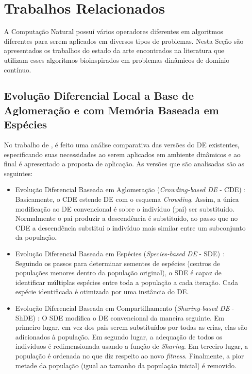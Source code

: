 \chapter{Trabalhos Relacionados}
\label{ch:relacionados}
A Computação Natural possuí vários operadores diferentes em algoritmos diferentes para serem aplicados em diversos tipos de problemas. Nesta Seção são apresentados os trabalhos do estado da arte encontrados na literatura que utilizam esses algoritmos bioinspirados em problemas dinâmicos de domínio contínuo.

\section{Evolução Diferencial Local a Base de Aglomeração e com Memória Baseada em Espécies}
\label{sec:crowding_base_de}

No trabalho de \cite{kundu2013crowding}, é feito uma análise comparativa das versões do DE existentes, especificando suas necessidades ao serem aplicados em ambiente dinâmicos e ao final é apresentado a proposta de aplicação. As versões que são analisadas são as seguintes:

\begin{itemize}
\item Evolução Diferencial Baseada em Aglomeração (\textit{Crowding-based DE} - CDE) \cite{thomsen2004multimodal}: Basicamente, o CDE estende DE com o esquema \textit{Crowding}. Assim, a única modificação ao DE convencional é sobre o indivíduo (pai) ser substituído. Normalmente o pai produzir a descendência é substituído, ao passo que no CDE a descendência substitui o indivíduo mais similar entre um subconjunto da população.

\item Evolução Diferencial Baseada em Espécies (\textit{Species-based DE} - SDE) \cite{li2005efficient}: Seguindo os passos para determinar sementes de espécies (centros de populações menores dentro da população original), o SDE é capaz de identificar múltiplas espécies entre toda a população a cada iteração. Cada espécie identificada é otimizada por uma instância do DE.

\item Evolução Diferencial Baseada em Compartilhamento (\textit{Sharing-based DE} - ShDE) \cite{thomsen2004multimodal}: O SDE modifica o DE convencional da maneira seguinte. Em primeiro lugar, em vez dos pais serem substituídos por todas as crias, elas são adicionados à população. Em segundo lugar, a adequação de todos os indivíduos é redimensionada usando a função de \textit{Sharing}. Em terceiro lugar, a população é ordenada no que diz respeito ao novo \textit{fitness}. Finalmente, a pior metade da população (igual ao tamanho da população inicial) é removido.
\end{itemize}


